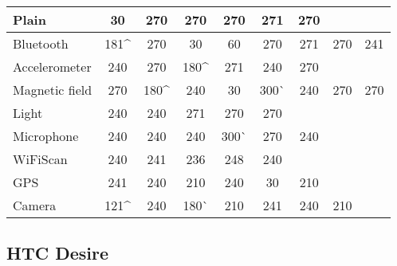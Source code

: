 \begin{table}
    \begin{tabular}{| l | c | c | c | c | c | c | c | c | }
    \hline
    Plain          & \cellcolor{red!25}30  & 270  & 270   & 270   & 271       & 270 & ~      & ~   \\ \hline
    Bluetooth      & 181\^ & 270  & \cellcolor{red!25}30   & \cellcolor{red!25}60   & 270       & 271 & 270      & 241 \\ \hline
    Accelerometer  & 240  & 270  & 180\^ & 271   & 240       & 270 & ~      & ~  \\ \hline
    Magnetic field & 270  & 180\^ & 240   & \cellcolor{red!25}30   & 300^^   & 240 & 270      & 270 \\ \hline
    Light          & 240  & 240  & 271   & 270   & 270       & ~ & ~        & ~   \\ \hline
    Microphone     & 240  & 240  & 240   & 300^^ & 270       & 240 & ~     & ~   \\ \hline
    WiFiScan       & 240  & 241  & 236   & 248 & 240 & ~  & ~   \\ \hline
    GPS            & 241  & 240  & 210 & 240 & \cellcolor{red!25}30 & 210  \\ \hline
    Camera         & 121\^ & 240  & 180^^ & 210   & 241       & 240 & 210      & ~  \\ \hline
    \end{tabular}
\end{table}



\subsection{HTC Desire}	

